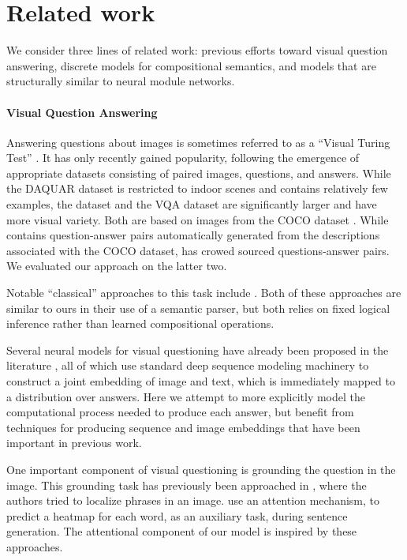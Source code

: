 \section{Related work}
We consider three lines of related work: previous efforts toward visual question
answering, discrete models for compositional semantics, and models that are
structurally similar to neural module networks.

\paragraph{Visual Question Answering}
Answering questions about images is sometimes referred to as a ``Visual
Turing Test'' \cite{malinowski14nips,geman15nas}. It has only recently gained
popularity, following the emergence of appropriate datasets consisting of paired
images, questions, and answers. While the DAQUAR dataset \cite{malinowski14nips}
is restricted to indoor scenes and contains relatively few examples, the \cocoqa
dataset \cite{yu15arxiv} and the VQA dataset \cite{antol15iccv} are
significantly larger and have more visual variety. Both are based on images from
the COCO dataset \cite{lin14eccv}. While \cocoqa contains question-answer pairs
automatically generated from the descriptions associated with the COCO dataset,
\cite{antol15iccv} has crowed sourced questions-answer pairs. We evaluated our
approach on the latter two.

Notable ``classical'' approaches to this task include
\cite{malinowski14nips,Krish2013Grounded}. Both of these approaches are similar
to ours in their use of a semantic parser, but both relies on fixed logical
inference rather than learned compositional operations.

Several neural models for visual questioning have already been proposed in the
literature \cite{ren2015image,ma15arxiv,gao2015you}, all of which use standard
deep sequence modeling machinery to construct a joint embedding of image and
text, which is immediately mapped to a distribution over answers. Here we
attempt to more explicitly model the computational process needed to produce
each answer, but benefit from techniques for producing sequence and image
embeddings that have been important in previous work.

One important component of visual questioning is grounding the question in the
image. This grounding task has previously been approached in
\cite{karpathy14nips,plummer15iccv,karpathy15cvpr,kong14cvpr}, where the authors
tried to localize phrases in an image. \cite{xu2015arxiv} use an attention
mechanism, to predict a heatmap for each word, as an auxiliary task, during
sentence generation. The attentional component of our model is inspired by these approaches.

